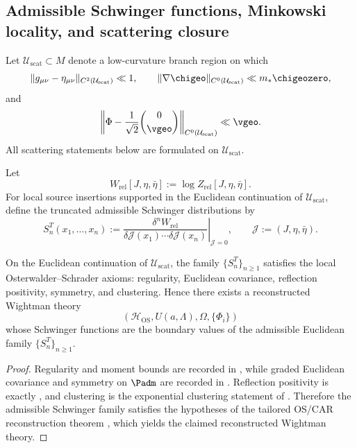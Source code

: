 \subsection{Admissible Schwinger functions, Minkowski locality, and scattering closure}

\begin{definition}
\label{def:laboratory-scattering-sector}
Let $\mathcal U_{\mathrm{scat}}\subset M$ denote a low-curvature branch region on which
\[
\|g_{\mu\nu}-\eta_{\mu\nu}\|_{C^2(\mathcal U_{\mathrm{scat}})}\ll 1,
\qquad
\|\nabla\chigeo\|_{C^0(\mathcal U_{\mathrm{scat}})}\ll m_*\chigeozero,
\]
and
\[
\left\|
\Phi-\frac{1}{\sqrt2}\binom{0}{\vgeo}
\right\|_{C^0(\mathcal U_{\mathrm{scat}})}
\ll
\vgeo.
\]
All scattering statements below are formulated on $\mathcal U_{\mathrm{scat}}$.
\end{definition}

\begin{definition}
\label{def:admissible-schwinger-functions}
Let
\[
W_{\mathrm{rel}}[J,\eta,\bar\eta]:=\log Z_{\mathrm{rel}}[J,\eta,\bar\eta].
\]
For local source insertions supported in the Euclidean continuation of
$\mathcal U_{\mathrm{scat}}$, define the truncated admissible Schwinger distributions by
\[
S_n^T(x_1,\ldots,x_n)
:=
\left.
\frac{\delta^n W_{\mathrm{rel}}}{\delta\mathcal J(x_1)\cdots\delta\mathcal J(x_n)}
\right|_{\mathcal J=0},
\qquad
\mathcal J:=(J,\eta,\bar\eta).
\]
\end{definition}

\begin{theorem}
\label{thm:full-admissible-os-closure}
On the Euclidean continuation of $\mathcal U_{\mathrm{scat}}$, the family
$\{S_n^T\}_{n\ge 1}$ satisfies the local Osterwalder--Schrader axioms: regularity, Euclidean
covariance, reflection positivity, symmetry, and clustering. Hence there exists a reconstructed
Wightman theory
\[
(\mathcal H_{\mathrm{OS}},U(a,\Lambda),\Omega,\{\Phi_i\})
\]
whose Schwinger functions are the boundary values of the admissible Euclidean family
$\{S_n^T\}_{n\ge 1}$.
\end{theorem}

\begin{proof}
Regularity and moment bounds are recorded in
, while graded Euclidean covariance and symmetry on $\Padm$ are
recorded in . Reflection positivity is exactly
, and clustering is the exponential clustering statement
of . Therefore the admissible Schwinger family satisfies
the hypotheses of the tailored OS/CAR reconstruction theorem
, which yields the claimed reconstructed Wightman theory.
\end{proof}

